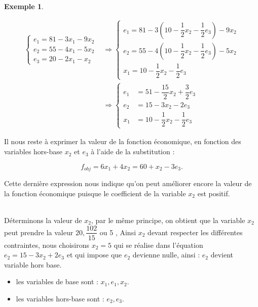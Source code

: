 \documentclass[a4paper,12pt,openany]{book}
\theoremstyle{plain}
\theoremstyle{definition}
\newtheorem{exemple}[theorem]{Exemple}
\theoremstyle{remark}
\theoremstyle{nbstyle}
\begin{document}
\begin{exemple}
\begin{description}
			\begin{align}
			\left\{\begin{array}{l}e_{1}=81-3 x_{1}-9 x_{2} \\ e_{2}=55-4 x_{1}-5 x_{2} \\ e_{3}=20-2 x_{1}-x_{2}\end{array}\right.& \Rightarrow\left\{\begin{array}{l}e_{1}=81-3\left(10-\dfrac{1}{2} x_{2}-\dfrac{1}{2} e_{3}\right)-9 x_{2} \\ e_{2}=55-4\left(10-\dfrac{1}{2} x_{2}-\dfrac{1}{2} e_{3}\right)-5 x_{2} \\ x_{1}=10-\dfrac{1}{2} x_{2}-\dfrac{1}{2} e_{3}\end{array}\right.\nonumber\\
			&\Rightarrow \begin{cases}e_{1} & =51-\dfrac{15}{2} x_{2}+\dfrac{3}{2} e_{3} \\ e_{2} & =15-3 x_{2}-2 e_{3} \\ x_{1} & =10-\dfrac{1}{2} x_{2}-\dfrac{1}{2} e_{3}\end{cases}\label{equ2.7}
			\end{align}
%			
%			
			
			Il nous reste à exprimer la valeur de la fonction économique, en fonction des variables hors-base $x_{2}$ et $e_{3}$ à l'aide de la substitution :
			
			$$
			f_{o b j}=6 x_{1}+4 x_{2}=60+x_{2}-3 e_{3} .
			$$
			
			Cette dernière expression nous indique qu'on peut améliorer encore la valeur de la fonction économique puisque le coefficient de la variable $x_{2}$ est positif.
			
			\item[Détermination de la troisième base : variable entrante est $x_{2}$]\quad\\
			Déterminons la valeur de $x_{2}$, par le même principe, on obtient que la variable $x_{2}$ peut prendre la valeur $20, \dfrac{102}{15}$ ou 5 , Ainsi $x_{2}$ devant respecter les différentes contraintes, nous choisirons $x_{2}=5$ qui se réalise dans l'équation $e_{2}=15-3 x_{2}+2 e_{3}$ et qui impose que $e_{2}$ devienne nulle, ainsi : $e_{2}$ devient variable hors base.
			
			\begin{itemize}
				\item les variables de base sont : $x_{1}, e_{1}, x_{2}$.
				\item les variables hors-base sont : $e_{2}, e_{3}$.
			\end{itemize}
			

\end{description}
\end{exemple}
\end{document}
